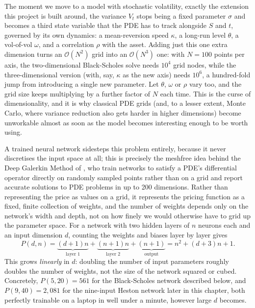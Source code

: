 \documentclass[a4paper,11pt, titlepage]{article}
\theoremstyle{definition}
\theoremstyle{plain}
\theoremstyle{remark}
\begin{document}
The moment we move to a model with stochastic volatility, exactly the extension this project is built around, the variance $V_t$ stops being a fixed parameter $\sigma$ and becomes a third state variable that the PDE has to track alongside $S$ and $t$, governed by its own dynamics: a mean-reversion speed $\kappa$, a long-run level $\theta$, a vol-of-vol $\omega$, and a correlation $\rho$ with the asset. Adding just this one extra dimension turns an $\mathcal{O}(N^2)$ grid into an $\mathcal{O}(N^3)$ one: with $N = 100$ points per axis, the two-dimensional Black-Scholes solve needs $10^4$ grid nodes, while the three-dimensional version (with, say, $\kappa$ as the new axis) needs $10^6$, a hundred-fold jump from introducing a single new parameter. Let $\theta$, $\omega$ or $\rho$ vary too, and the grid size keeps multiplying by a further factor of $N$ each time. This is the curse of dimensionality, and it is why classical PDE grids (and, to a lesser extent, Monte Carlo, where variance reduction also gets harder in higher dimensions) become unworkable almost as soon as the model becomes interesting enough to be worth using.

A trained neural network sidesteps this problem entirely, because it never discretises the input space at all; this is precisely the meshfree idea behind the Deep Galerkin Method of \cite{sirignano2018}, who train networks to satisfy a PDE's differential operator directly on randomly sampled points rather than on a grid and report accurate solutions to PDE problems in up to 200 dimensions. Rather than representing the price as values on a grid, it represents the pricing function as a fixed, finite collection of weights, and the number of weights depends only on the network's width and depth, not on how finely we would otherwise have to grid up the parameter space. For a network with two hidden layers of $n$ neurons each and an input dimension $d$, counting the weights and biases layer by layer gives
\[
P(d, n) = \underbrace{(d+1)n}_{\text{layer 1}} + \underbrace{(n+1)n}_{\text{layer 2}} + \underbrace{(n+1)}_{\text{output}} = n^2 + (d+3)n + 1 .
\]
This grows \emph{linearly} in $d$: doubling the number of input parameters roughly doubles the number of weights, not the size of the network squared or cubed. Concretely, $P(5, 20) = 561$ for the Black-Scholes network described below, and $P(9, 40) = 2{,}081$ for the nine-input Heston network later in this chapter, both perfectly trainable on a laptop in well under a minute, however large $d$ becomes.
\end{document}
